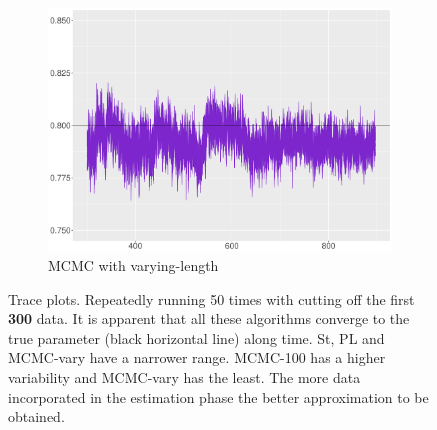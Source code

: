\begin{figure}[h]
\begin{subfigure}[t]{0.46\textwidth}
\includegraphics[width=\textwidth]{Chapters/04Filtering/plot/MCMCchainVary.pdf}
 \caption{MCMC with varying-length}
   \end{subfigure}
\caption{Trace plots. Repeatedly running 50 times with cutting off the first \textbf{300} data. It is apparent that all these algorithms converge to the true parameter (black horizontal line) along time. St, PL and MCMC-vary have a narrower range. MCMC-100 has a higher variability and MCMC-vary has the least. The more data incorporated in the estimation phase the better approximation to be obtained. }\label{FilterRiewComparesion01}
\end{figure}

